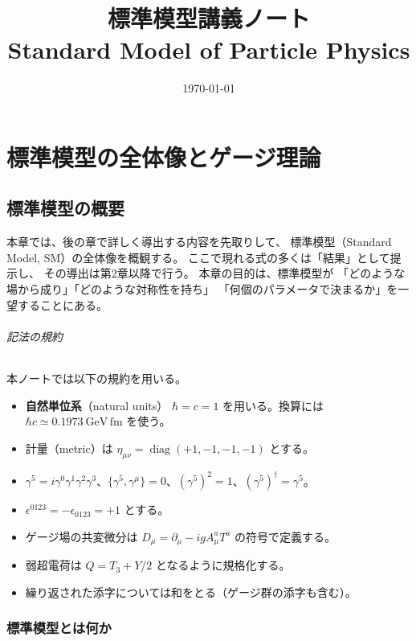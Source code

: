\documentclass[uplatex,dvipdfmx,a4paper,11pt,openany]{jsbook}
\title{
標準模型講義ノート\\
\large Standard Model of Particle Physics
}
\author{}
\date{\today}
\newcommand{\term}[2]{\textbf{#1}（#2）}
\newcommand{\en}[1]{（#1）}
\numberwithin{equation}{chapter}
\theoremstyle{definition}
\theoremstyle{plain}
\theoremstyle{remark}
\newcommand{\diag}{\operatorname{diag}}
\begin{document}
\maketitle
\tableofcontents
\part{標準模型の全体像とゲージ理論}
\chapter{標準模型の概要}
本章では、後の章で詳しく導出する内容を先取りして、
標準模型（Standard Model, SM）の全体像を概観する。
ここで現れる式の多くは「結果」として提示し、
その導出は第2章以降で行う。
本章の目的は、標準模型が
「どのような場から成り」「どのような対称性を持ち」
「何個のパラメータで決まるか」を一望することにある。
\paragraph{記法の規約}
本ノートでは以下の規約を用いる。
\begin{itemize}
    \item \term{自然単位系}{natural units} $\hbar=c=1$ を用いる。換算には $\hbar c\simeq0.1973\ \mathrm{GeV\,fm}$ を使う。
    \item 計量\en{metric}は $\eta_{\mu\nu}=\diag(+1,-1,-1,-1)$ とする。
    \item $\gamma^5=i\gamma^0\gamma^1\gamma^2\gamma^3$、$\{\gamma^5,\gamma^\mu\}=0$、$(\gamma^5)^2=1$、$(\gamma^5)^\dagger=\gamma^5$。
    \item $\epsilon^{0123}=-\epsilon_{0123}=+1$ とする。
    \item ゲージ場の共変微分は $D_\mu=\partial_\mu-igA_\mu^aT^a$ の符号で定義する。
    \item 弱超電荷は $Q=T_3+Y/2$ となるように規格化する。
    \item 繰り返された添字については和をとる（ゲージ群の添字も含む）。
\end{itemize}
\section{標準模型とは何か}
\end{document}
